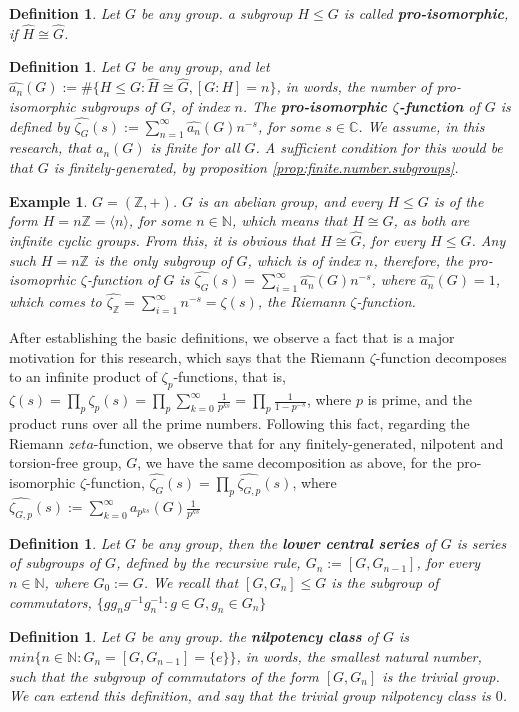 \documentclass[12pt]{article}
\newtheorem{definition}[theorem]{Definition}
\newtheorem{example}[theorem]{Example}
\begin{document}
\begin{definition}
\label{def:pro.isomorphic}
Let $G$ be any group. a subgroup $H\leq G$ is called \textbf{pro-isomorphic}, if $\widehat{H}\cong\widehat{G}$.
\end{definition}
\begin{definition}
\label{def:zeta.pro.isomorphic}
Let $G$ be any group, and let $\widehat{a_n}(G):=\#\{H\leq G : \widehat{H}\cong\widehat{G}, [G:H]=n\}$, in words, the number of pro-isomorphic subgroups of $G$, of index $n$. The \textbf{pro-isomorphic $\zeta$-function} of $G$ is defined by $\widehat{\zeta_G}(s):=\sum_{n=1}^{\infty}\widehat{a_n}(G)n^{-s}$, for some $s\in\mathbb{C}$. We assume, in this research, that $\widehat{a_n}(G)$ is finite for all $G$. A sufficient condition for this would be that $G$ is finitely-generated, by proposition \ref{prop:finite.number.subgroups}.
\end{definition}
\begin{example}
$G=(\mathbb{Z},+)$. $G$ is an abelian group, and every $H\leq G$ is of the form $H=n\mathbb{Z}=\langle n\rangle$, for some $n\in\mathbb{N}$, which means that $H\cong G$, as both are infinite cyclic groups. From this, it is obvious that $\widehat{H}\cong\widehat{G}$, for every $H\leq G$. Any such $H=n\mathbb{Z}$ is the only subgroup of $G$, which is of index $n$, therefore, the pro-isomoprhic $\zeta$-function of $G$ is $\widehat{\zeta_G}(s)=\sum_{i=1}^{\infty}\widehat{a_n}(G)n^{-s}$, where $\widehat{a_n}(G)=1$, which comes to $\widehat{\zeta_{\mathbb{Z}}}=\sum_{i=1}^{\infty}n^{-s}=\zeta(s)$, the Riemann $\zeta$-function. 
\end{example}
After establishing the basic definitions, we observe a fact that is a major motivation for this research, which says that the Riemann $\zeta$-function decomposes to an infinite product of $\zeta_p$-functions, that is, $\zeta(s)=\prod_p\zeta_p(s)=\prod_p\sum_{k=0}^\infty\frac{1}{p^{ks}}=\prod_p\frac{1}{1-p^{-s}}$, where $p$ is prime, and the product runs over all the prime numbers. Following this fact, regarding the Riemann $zeta$-function, we observe that for any finitely-generated, nilpotent and torsion-free group, $G$, we have the same decomposition as above, for the pro-isomorphic $\zeta$-function, $\widehat{\zeta_G}(s)=\prod_p\widehat{\zeta_{G,p}}(s)$, where $\widehat{\zeta_{G,p}}(s):=\sum_{k=0}^\infty a_{p^{ks}}(G)\frac{1}{p^{ks}}$
\begin{definition}
\label{def.lower.central.series}
Let $G$ be any group, then the \textbf{lower central series} of $G$ is series of subgroups of $G$, defined by the recursive rule, $G_n:=[G,G_{n-1}]$, for every $n\in\mathbb{N}$, where $G_0:=G$.  We recall that $[G,G_n]\leq G$ is the subgroup of commutators, $\{gg_ng^{-1}g_n^{-1} : g\in G,g_n\in G_n\}$
\end{definition}
\begin{definition}
\label{def.nilpotency.class}
Let $G$ be any group. the \textbf{nilpotency class} of $G$ is $min\{n\in\mathbb{N} : G_n=[G,G_{n-1}]=\{e\}\}$, in words, the smallest natural number, such that the subgroup of commutators of the form $[G,G_n]$ is the trivial group. We can extend this definition, and say that the trivial group nilpotency class is $0$.
\end{definition}
\end{document}
